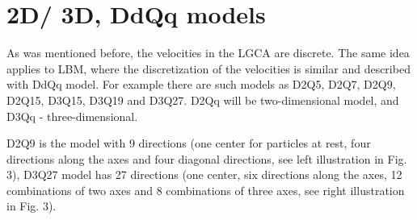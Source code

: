 
\section{2D/ 3D, DdQq models}

As was mentioned before, the velocities in the LGCA are discrete. The same idea applies to LBM, where the discretization of the velocities is similar and described with DdQq model. For example there are  such models as D2Q5, D2Q7, D2Q9, D2Q15, D3Q15, D3Q19 and D3Q27. D2Qq will be two-dimensional model, and D3Qq - three-dimensional.

D2Q9 is the model with 9 directions (one center for particles at rest, four directions along the axes and four diagonal directions, see left illustration in Fig. 3), D3Q27 model has 27 directions (one center, six directions along the axes, 12 combinations of two axes and 8 combinations of three axes, see right illustration in Fig. 3).

